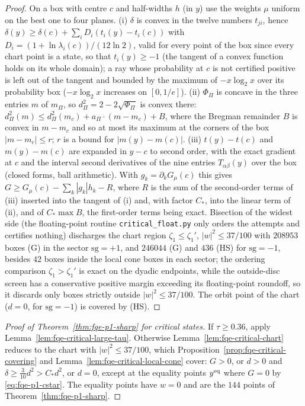 \begin{proof}
On a box with centre $c$ and half-widths $h$ (in $y$) use the weights $\mu$ uniform on the best one to four planes.
(i) $\delta$ is convex in the twelve numbers $t_{ji}$, hence $\delta(y)\ge\delta(c)+\sum_iD_i(t_i(y)-t_i(c))$ with
$D_i=(1+\ln\lambda_i(c))/(12\ln2)$, valid for every point of the box since every chart point is a state, so that $t_i(y)\ge-1$
(the tangent of a convex function holds on its whole domain); a ray whose probability at $c$ is not certified positive is left
out of the tangent and bounded by the maximum of $-x\log_2x$ over its probability box ($-x\log_2x$ increases on $[0,1/e]$).
(ii) $\Phi_\Pi$ is concave in the three entries $m$ of $m_\Pi$, so $d_\Pi^2=2-2\sqrt{\Phi_\Pi}$ is convex there:
$d_\Pi^2(m)\le d_\Pi^2(m_c)+a_\Pi\!\cdot\!(m-m_c)+B$, where the Bregman remainder $B$ is convex in $m-m_c$ and so at most its maximum at the
corners of the box $|m-m_c|\le r$; $r$ is a bound for $|m(y)-m(c)|$.
(iii) $t(y)-t(c)$ and $m(y)-m(c)$ are expanded in $y-c$ to second order, with the exact gradient at $c$ and the interval second
derivatives of the nine entries $T_{\alpha\beta}(y)$ over the box (closed forms, ball arithmetic).
With $g_k=\partial_kG_\mu(c)$ this gives $G\ge G_\mu(c)-\sum_k|g_k|h_k-R$, where $R$ is the sum of the second-order terms of (iii)
inserted into the tangent of (i) and, with factor $C_*$, into the linear term of (ii), and of $C_*\max B$, the first-order terms being exact.
Bisection of the widest side (the floating-point routine \texttt{critical\_float.py} only orders the attempts and certifies nothing)
discharges the chart region $\zeta_1\le\zeta_1'$, $|w|^2\le37/100$ with $208953$ boxes (G) in the sector $\mathrm{sg}=+1$, and
$246044$ (G) and $436$ (HS) for $\mathrm{sg}=-1$, besides $42$ boxes inside the local cone boxes in each sector;
the ordering comparison $\zeta_1>\zeta_1'$ is exact on the dyadic endpoints, while the outside-disc screen has a conservative
positive margin exceeding its floating-point roundoff, so it discards only boxes strictly outside $|w|^2\le37/100$.
The orbit point of the chart ($d=0$, for
$\mathrm{sg}=-1$) is covered by (HS).
\end{proof}

\begin{proof}[Proof of Theorem~\ref{thm:fqe-p1-sharp} for critical states]
If $\tau\ge0.36$, apply Lemma~\ref{lem:fqe-critical-large-tau}.  Otherwise Lemma~\ref{lem:fqe-critical-chart} reduces to
the chart with $|w|^2\le37/100$, which Proposition~\ref{prop:fqe-critical-covering} and Lemma~\ref{lem:fqe-critical-local-cone}
cover: $G>0$, or $d>0$ and $\delta\ge\frac3{10}d^2>C_*d^2$, or $d=0$, except at the equality points $y^{\rm eq}$ where $G=0$ by
\eqref{eq:fqe-p1-cstar}.  The equality points have $w=0$ and are the $144$ points of Theorem~\ref{thm:fqe-p1-sharp}.
\end{proof}

